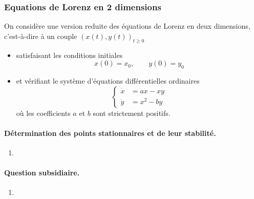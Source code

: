 \subsubsection{Equations de Lorenz en 2 dimensions} 

On considère une version reduite des équations de Lorenz en deux dimensions, c'est-à-dire à un couple $(x(t), y(t))_{t \geq 0}$ 
\begin{itemize}
  \item satisfaisant les conditions initiales
  $$
  x(0) = x_0, \qquad y(0) = y_0
  $$
  \item et vérifiant le système d'équations différentielles ordinaires
  \begin{equation} \label{eq:lorenz2D}
    \left\{\begin{array}{rcl}
            \dot x & = a x - xy \\
            \dot y & = x^2 - by
          \end{array}\right.
  \end{equation}
  où les coefficients $a$ et $b$ sont strictement positifs.
\end{itemize}

\bigskip
\paragraph{Détermination des points stationnaires et de leur stabilité.}
\begin{enumerate}
  \item \todo{}
  \solution{
  \todo{}
  }
\end{enumerate}

\bigskip
\paragraph{Question subsidiaire.}
\begin{enumerate}
  \item \todo{}
\end{enumerate}
